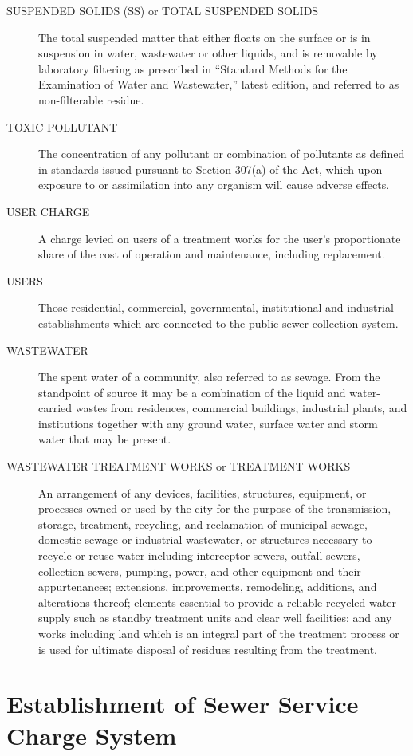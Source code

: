 \begin{description}
\item[SUSPENDED SOLIDS (SS) or TOTAL SUSPENDED SOLIDS] The total suspended matter that either floats on the surface or is in suspension in water, wastewater or other liquids, and is removable by laboratory filtering as prescribed in “Standard Methods for the Examination of Water and Wastewater,” latest edition, and referred to as non-filterable residue.
\item[TOXIC POLLUTANT] The concentration of any pollutant or combination of pollutants as defined in standards issued pursuant to Section 307(a) of the Act, which upon exposure to or assimilation into any organism will cause adverse effects.
\item[USER CHARGE] A charge levied on users of a treatment works for the user’s proportionate share of the cost of operation and maintenance, including replacement.
\item[USERS] Those residential, commercial, governmental, institutional and industrial establishments which are connected to the public sewer collection system.
\item[WASTEWATER] The spent water of a community, also referred to as sewage.  From the standpoint of source it may be a combination of the liquid and water-carried wastes from residences, commercial buildings, industrial plants, and institutions together with any ground water, surface water and storm water that may be present.
\item[WASTEWATER TREATMENT WORKS or TREATMENT WORKS] An arrangement of any devices, facilities, structures, equipment, or processes owned or used by the city for the purpose of the transmission, storage, treatment, recycling, and reclamation of municipal sewage, domestic sewage or industrial wastewater, or structures necessary to recycle or reuse water including interceptor sewers, outfall sewers, collection sewers, pumping, power, and other equipment and their appurtenances; extensions, improvements, remodeling, additions, and alterations thereof; elements essential to provide a reliable recycled water supply such as standby treatment units and clear well facilities; and any works including land which is an integral part of the treatment process or is used for ultimate disposal of residues resulting from the treatment.
\end{description}

\section{Establishment of Sewer Service Charge System}
